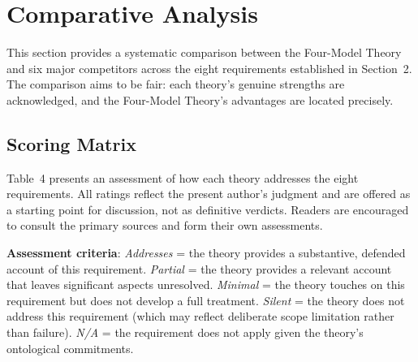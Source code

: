 \documentclass[12pt]{article}
\begin{document}
\section{Comparative Analysis}

This section provides a systematic comparison between the Four-Model Theory and six major competitors across the eight requirements established in Section~2. The comparison aims to be fair: each theory's genuine strengths are acknowledged, and the Four-Model Theory's advantages are located precisely.


\subsection{Scoring Matrix}

Table~4 presents an assessment of how each theory addresses the eight requirements. All ratings reflect the present author's judgment and are offered as a starting point for discussion, not as definitive verdicts. Readers are encouraged to consult the primary sources and form their own assessments.

\textbf{Assessment criteria}: \emph{Addresses} = the theory provides a substantive, defended account of this requirement. \emph{Partial} = the theory provides a relevant account that leaves significant aspects unresolved. \emph{Minimal} = the theory touches on this requirement but does not develop a full treatment. \emph{Silent} = the theory does not address this requirement (which may reflect deliberate scope limitation rather than failure). \emph{N/A} = the requirement does not apply given the theory's ontological commitments.
\end{document}

